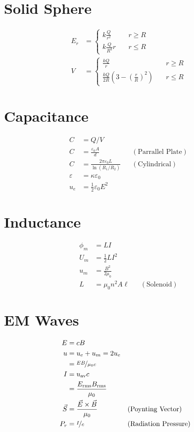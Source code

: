 \documentclass[10pt]{article}
\begin{document}
\begin{multicols*}{5}
\section{Solid Sphere}

\begin{align*}
    E_r &=
    \begin{cases}
    k \frac{Q}{r^2} & \quad r \geq R\\
    k \frac{Q}{R^3} r & \quad r \leq R
    \end{cases}\\
    V &=
    \begin{cases}
    \frac{kQ}{r} & \quad r \geq R\\
    \frac{kQ}{2R} \left({3 - \left({\frac{r}{R}}\right)^2}\right) &
    \quad r \leq R
    \end{cases}
\end{align*}

\section{Capacitance}

\begin{align*}
    C &= Q / V\\
    C &= \frac{\varepsilon_0 A}{d} && (\text{Parrallel Plate})\\
    C &= \frac{2\pi \varepsilon_0 L}{\ln (R_1 / R_2)} &&
    (\text{Cylindrical})\\
    \varepsilon &= \kappa \varepsilon_0\\
    u_e &= \frac{1}{2}\varepsilon_0 E^2
\end{align*}

\section{Inductance}

\begin{align*}
    \phi_m &= LI\\
    U_m &= \frac{1}{2} LI^2\\
    u_m &= \frac{B^2}{2\mu_0}\\
    L &= \mu_0 n^2 A \ell && (\text{Solenoid})
\end{align*}

\section{EM Waves}

\begin{align*}
    E &= cB\\
    u &= u_e + u_m = 2u_e\\
      &= \nicefrac{EB}{\mu_0 c}\\
    I &= u_\text{av}c\\
      &= \frac{E_\text{rms}B_\text{rms}}{\mu_0}\\
    \vec{S} &= \frac{\vec{E} \times \vec{B}}{\mu_0} && (\text{Poynting
	Vector})\\
    P_r &= \nicefrac{I}{c} && (\text{Radiation Pressure})
\end{align*}


\end{multicols*}
\end{document}
